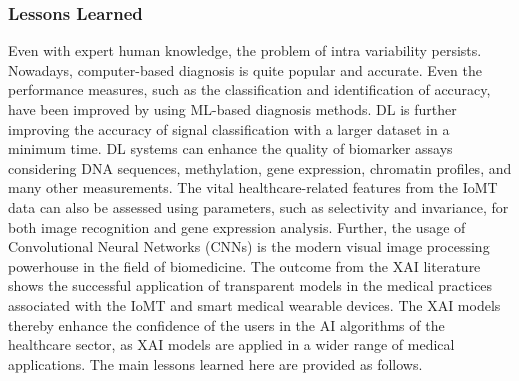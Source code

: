 \documentclass[journal]{IEEEtran}
\begin{document}
\subsubsection{Lessons Learned}
Even with expert human knowledge, the problem of intra variability persists. Nowadays, computer-based diagnosis is quite popular and accurate. Even the performance measures, such as the classification and identification of accuracy, have been improved by using ML-based diagnosis methods. DL is further improving the accuracy of signal classification with a larger dataset in a minimum time. DL systems can enhance the quality of biomarker assays considering DNA sequences, methylation, gene expression, chromatin profiles, and many other measurements. The vital healthcare-related features from the IoMT data can also be assessed using parameters, such as selectivity and invariance, for both image recognition and gene expression analysis. Further, the usage of Convolutional Neural Networks (CNNs) is the modern visual image processing powerhouse in the field of biomedicine. The outcome from the XAI literature shows the successful application of transparent models in the medical practices associated with the IoMT and smart medical wearable devices. The XAI models thereby enhance the confidence of the users in the AI algorithms of the healthcare sector, as XAI models are applied in a wider range of medical applications. The main lessons learned here are provided as follows.
\end{document}
